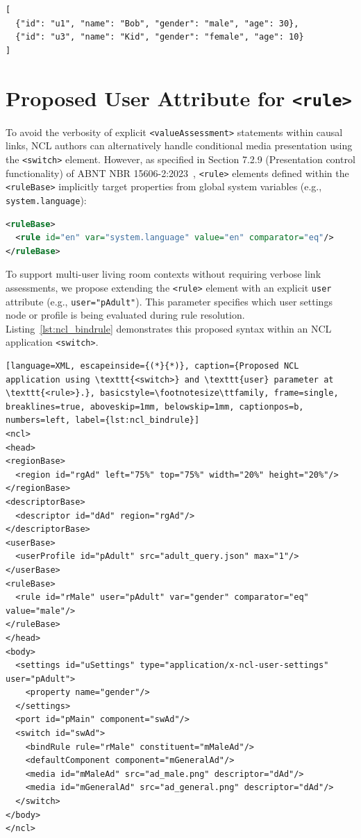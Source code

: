 \documentclass[sigconf,authorversion,review,authordraft]{webmedia}
\begin{document}
\begin{lstlisting}[caption={\texttt{users\_data\_with\_adult\_male.json}}, basicstyle=\footnotesize\ttfamily, label={lst:users_with_adult_json}]
[
  {"id": "u1", "name": "Bob", "gender": "male", "age": 30},
  {"id": "u3", "name": "Kid", "gender": "female", "age": 10}
]
\end{lstlisting}

\section{Proposed User Attribute for \texttt{<rule>}}
\label{sec:rule_proposal}

To avoid the verbosity of explicit \texttt{<valueAssessment>} statements within causal links, NCL authors can alternatively handle conditional media presentation using the \texttt{<switch>} element. However, as specified in Section 7.2.9 (Presentation control functionality) of ABNT NBR 15606-2:2023~\cite{abnt_15606_2_2023}, \texttt{<rule>} elements defined within the \texttt{<ruleBase>} implicitly target properties from global system variables (e.g., \texttt{system.language}):

\begin{lstlisting}[language=XML, caption={Standard \texttt{<rule>} definition targeting global system variables.}, basicstyle=\footnotesize\ttfamily, frame=single, breaklines=true, aboveskip=1mm, belowskip=1mm, captionpos=b]
<ruleBase>
  <rule id="en" var="system.language" value="en" comparator="eq"/>
</ruleBase>
\end{lstlisting}

To support multi-user living room contexts without requiring verbose link assessments, we propose extending the \texttt{<rule>} element with an explicit \texttt{user} attribute (e.g., \texttt{user="pAdult"}). This parameter specifies which user settings node or profile is being evaluated during rule resolution. Listing~\ref{lst:ncl_bindrule} demonstrates this proposed syntax within an NCL application \texttt{<switch>}.

\begin{lstlisting}[language=XML, escapeinside={(*}{*)}, caption={Proposed NCL application using \texttt{<switch>} and \texttt{user} parameter at \texttt{<rule>}.}, basicstyle=\footnotesize\ttfamily, frame=single, breaklines=true, aboveskip=1mm, belowskip=1mm, captionpos=b, numbers=left, label={lst:ncl_bindrule}]
<ncl>
<head>
<regionBase>
  <region id="rgAd" left="75%" top="75%" width="20%" height="20%"/>
</regionBase>
<descriptorBase>
  <descriptor id="dAd" region="rgAd"/>
</descriptorBase>
<userBase>
  <userProfile id="pAdult" src="adult_query.json" max="1"/>
</userBase>
<ruleBase>
  <rule id="rMale" user="pAdult" var="gender" comparator="eq" value="male"/>
</ruleBase>
</head>
<body>
  <settings id="uSettings" type="application/x-ncl-user-settings" user="pAdult">
    <property name="gender"/>
  </settings>
  <port id="pMain" component="swAd"/>
  <switch id="swAd">
    <bindRule rule="rMale" constituent="mMaleAd"/>
    <defaultComponent component="mGeneralAd"/>
    <media id="mMaleAd" src="ad_male.png" descriptor="dAd"/>
    <media id="mGeneralAd" src="ad_general.png" descriptor="dAd"/>
  </switch>
</body>
</ncl>
\end{lstlisting}
\end{document}

